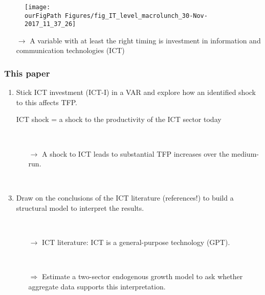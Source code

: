\documentclass{beamer}
\def \ourFigPath {../../}
\begin{document}
\begin{frame}
	\frametitle{}
	
		\noindent
	\begin{figure}
		\centering
		\texttt{[image: \\ourFigPath Figures/fig\_IT\_level\_macrolunch\_30-Nov-2017\_11\_37\_26]}
	\end{figure}
	
	\begin{itemize}
		
		\item [$\rightarrow$] A variable with at least the right timing is investment in information and communication technologies (ICT)
	
	
	\end{itemize} 

\end{frame}


\begin{frame}
	\frametitle{This paper}
	
	\begin{enumerate}
	\item Stick ICT investment (ICT-I) in a VAR and explore how an identified shock to this affects TFP.
	\item [] ICT shock = a shock to the productivity of the ICT sector today
	
	\
	
	\begin{itemize}
	\item [$\rightarrow$] A shock to ICT leads to substantial TFP increases over the medium-run.
	\end{itemize}

\
	
    \item Draw on the conclusions of the ICT literature (references!) to build a structural model to interpret the results. 
    
    \
    
    	\begin{itemize}
	\item [$\rightarrow$] ICT literature: ICT is a general-purpose technology (GPT).
	
	\
	
	\item[$\Rightarrow$] Estimate a two-sector endogenous growth model to ask whether aggregate data supports this interpretation. 
	\end{itemize}
	
	\end{enumerate} 

\end{frame}
\end{document}
